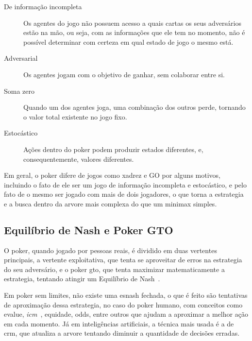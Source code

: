 \documentclass[twocolumn]{article}
\theoremstyle{mytheoremstyle}
\theoremstyle{mytheoremstyle}
\theoremstyle{myproblemstyle}
\begin{document}
        \begin{description}
            \item[De informação incompleta] Os agentes do jogo não possuem acesso a quais cartas os seus adversários estão na mão, ou seja,
                com as informações que ele tem no momento, não é possível determinar com certeza em qual estado de jogo o mesmo está.

            \item[Adversarial] Os agentes jogam com o objetivo de ganhar, sem colaborar entre si.

            \item[Soma zero] Quando um dos agentes joga, uma combinação dos outros perde, tornando o valor total existente no jogo fixo.

            \item[Estocástico] Ações dentro do poker podem produzir estados diferentes, e, consequentemente, valores diferentes.
        \end{description}

        Em geral, o poker difere de jogos como xadrez e GO por alguns motivos, incluindo o fato de ele ser um jogo de informação incompleta
        e estocástico, e pelo fato de o mesmo ser jogado com mais de dois jogadores, o que torna a \gls{estrategia} e a busca dentro da \gls{arvore}
        mais complexa do que um minimax simples.

        \subsection{Equilíbrio de Nash e Poker GTO} %
        \label{ssub:Equilíbrio de Nash e Poker GTO}
            O poker, quando jogado por pessoas reais, é dividido em duas vertentes principais, a vertente exploitativa, que tenta se aproveitar
            de erros na \gls{estrategia} do seu adversário, e o poker \acrfull{gto}, que tenta maximizar matematicamente a \gls{estrategia},
            tentando atingir um Equilíbrio de Nash~\cite{nash1950equilibrium}.

            Em poker sem limites, não existe uma \gls{esnash} fechada, o que é feito são tentativas de aproximação dessa \gls{estrategia},
            no caso do poker humano, com conceitos como \gls{evalue},
            \emph{\gls{icm}}~\cite{gilbert2009independent}, \gls{equidade},
            \gls{odds}, entre outros
            que ajudam a aproximar a melhor ação em cada momento. Já em inteligências artificiais, a técnica mais usada é a de \acrfull{crm}, que atualiza a \gls{arvore} tentando diminuir a quantidade de decisões erradas.
\end{document}
